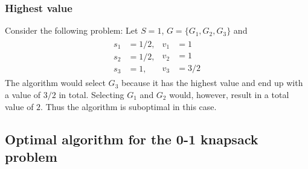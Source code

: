 \documentclass{article}
\begin{document}
\subsubsection{Highest value}

Consider the following problem: Let $S=1$, $G=\{G_1, G_2, G_3\}$ and
\begin{align*}
    \begin{split}
        s_1&=1/2,\\
        s_2&=1/2,\\
        s_3&=1,
    \end{split}
    \begin{split}
        v_1 &= 1\\
        v_2 &= 1\\
        v_3 &= 3/2
    \end{split}
\end{align*}
The algorithm would select $G_3$ because it has the highest value
and end up with a value of $3/2$ in total. Selecting $G_1$ and
$G_2$ would, however, result in a total value of $2$. Thus the
algorithm is suboptimal in this case.

\subsection{Optimal algorithm for the 0-1 knapsack problem}
\end{document}
